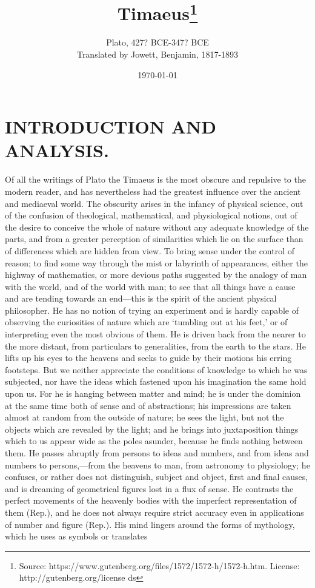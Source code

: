 \documentclass[11pt,letter]{article}
\begin{document}
\title{Timaeus\thanks{Source: https://www.gutenberg.org/files/1572/1572-h/1572-h.htm. License: http://gutenberg.org/license ds}}
\date{\today}
\author{Plato, 427? BCE-347? BCE\\ Translated by Jowett, Benjamin, 1817-1893}
\maketitle

\setcounter{tocdepth}{1}
\tableofcontents
\renewcommand{\baselinestretch}{1.0}
\normalsize
\newpage

\section{
      INTRODUCTION AND ANALYSIS.
    }
\par  Of all the writings of Plato the Timaeus is the most obscure and repulsive to the modern reader, and has nevertheless had the greatest influence over the ancient and mediaeval world. The obscurity arises in the infancy of physical science, out of the confusion of theological, mathematical, and physiological notions, out of the desire to conceive the whole of nature without any adequate knowledge of the parts, and from a greater perception of similarities which lie on the surface than of differences which are hidden from view. To bring sense under the control of reason; to find some way through the mist or labyrinth of appearances, either the highway of mathematics, or more devious paths suggested by the analogy of man with the world, and of the world with man; to see that all things have a cause and are tending towards an end—this is the spirit of the ancient physical philosopher. He has no notion of trying an experiment and is hardly capable of observing the curiosities of nature which are ‘tumbling out at his feet,’ or of interpreting even the most obvious of them. He is driven back from the nearer to the more distant, from particulars to generalities, from the earth to the stars. He lifts up his eyes to the heavens and seeks to guide by their motions his erring footsteps. But we neither appreciate the conditions of knowledge to which he was subjected, nor have the ideas which fastened upon his imagination the same hold upon us. For he is hanging between matter and mind; he is under the dominion at the same time both of sense and of abstractions; his impressions are taken almost at random from the outside of nature; he sees the light, but not the objects which are revealed by the light; and he brings into juxtaposition things which to us appear wide as the poles asunder, because he finds nothing between them. He passes abruptly from persons to ideas and numbers, and from ideas and numbers to persons,—from the heavens to man, from astronomy to physiology; he confuses, or rather does not distinguish, subject and object, first and final causes, and is dreaming of geometrical figures lost in a flux of sense. He contrasts the perfect movements of the heavenly bodies with the imperfect representation of them (Rep.), and he does not always require strict accuracy even in applications of number and figure (Rep.). His mind lingers around the forms of mythology, which he uses as symbols or translates 
\end{document}
